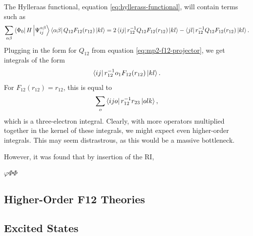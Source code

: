 The Hylleraas functional, equation \ref{eq:hyllerass-functional}, will contain terms such as
\begin{equation}
    \sum_{\alpha\beta}\bra{\Phi_0}H\ket{\Psi_{ij}^{\alpha\beta}} \bra{\alpha\beta}Q_{12}F_{12}(r_{12})\ket{kl} = 2\bra{ij}r_{12}^{-1}Q_{12}F_{12}(r_{12})\ket{kl} - \bra{jl}r_{12}^{-1}Q_{12}F_{12}(r_{12})\ket{kl}.
\end{equation}
Plugging in the form for $Q_{12}$ from equation \ref{eq:mp2-f12-projector}, we get integrals of the form
\begin{equation}
    \bra{ij}r_{12}^{-1}o_1F_{12}(r_{12})\ket{kl}.
\end{equation}
For $F_{12}(r_{12})=r_{12}$, this is equal to
\begin{equation}
    \sum_o\bra{ijo}r_{12}^{-1}r_{23}\ket{olk},
\end{equation}
which is a three-electron integral. Clearly, with more operators multiplied together in the kernel of these integrals, we might expect even higher-order integrals. This may seem distrastrous, as this would be a massive bottleneck.

However, it was found that by insertion of the \gls{RI},

$\varphi \varPhi\Phi$



\subsection{Higher-Order F12 Theories}


\subsection{Excited States}





